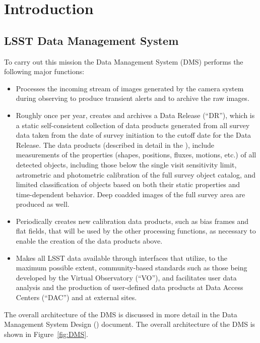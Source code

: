 \section{Introduction}

\subsection{LSST Data Management System}

To carry out this mission the Data Management System (DMS) performs the following major functions:

\begin{itemize}
\item Processes the incoming stream of images generated by the camera
  system during observing to produce transient alerts and to archive
  the raw images.

\item Roughly once per year, creates and archives a Data Release (``DR''),
  which is a static self-consistent collection of data products
  generated from all survey data taken from the date of survey
  initiation to the cutoff date for the Data Release. The data
  products (described in detail in the \DPDD), include measurements of 
  the properties (shapes, positions, fluxes, motions, etc.) of all detected
  objects, including those below the single visit sensitivity limit,
  astrometric and photometric calibration of the full survey object
  catalog, and limited classification of objects based on both their
  static properties and time-dependent behavior.  Deep coadded images
  of the full survey area are produced as well.

\item Periodically creates new calibration data products, such as bias
  frames and flat fields, that will be used by the other processing
  functions, as necessary to enable the creation of the data products above.

\item Makes all LSST data available through interfaces that utilize,
  to the maximum possible extent, community-based standards such as those
  being developed by the Virtual Observatory (``VO''), and facilitates user
  data analysis and the production of user-defined data products at Data
  Access Centers (``DAC'') and at external sites.
\end{itemize}

The overall architecture of the DMS is discussed in more detail in the Data Management System Design (\DMSD) document. The overall architecture of the DMS is shown in Figure~\ref{fig:DMS}.
\\

